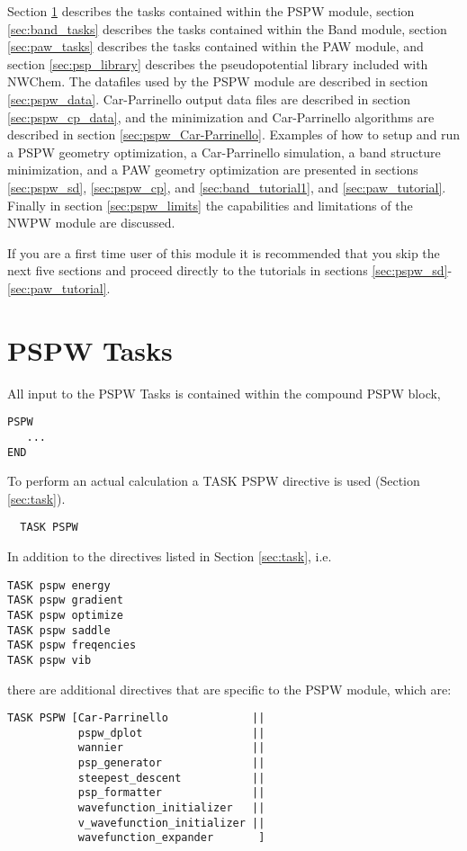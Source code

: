 Section \ref{sec:pspw_tasks} describes the tasks contained within the
PSPW module, section \ref{sec:band_tasks} describes the tasks
contained within the Band module, section \ref{sec:paw_tasks} describes
the tasks contained within the PAW module, and section \ref{sec:psp_library}
describes the pseudopotential library included with NWChem.  The
datafiles used by the PSPW module are described in section
\ref{sec:pspw_data}.  Car-Parrinello output data files are described
in section \ref{sec:pspw_cp_data}, and the minimization and
Car-Parrinello algorithms are described in 
section \ref{sec:pspw_Car-Parrinello}. 
Examples of how
to setup and run a PSPW geometry optimization, a Car-Parrinello
simulation, a band structure minimization, and a PAW geometry
optimization are presented in sections \ref{sec:pspw_sd}, \ref{sec:pspw_cp}, and
\ref{sec:band_tutorial1}, and \ref{sec:paw_tutorial}.  
Finally in section \ref{sec:pspw_limits} the capabilities and limitations of the NWPW module are  discussed.

If you are a first time user of this module it is recommended that you skip the next five sections and proceed directly to the tutorials in sections 
\ref{sec:pspw_sd}-\ref{sec:paw_tutorial}.

\section{PSPW Tasks}
\label{sec:pspw_tasks}

All input to the PSPW Tasks is contained within the compound PSPW block,
\begin{verbatim}
PSPW
   ...
END
\end{verbatim}

To perform an actual calculation a TASK PSPW directive is used
(Section \ref{sec:task}).  
\begin{verbatim}
  TASK PSPW
\end{verbatim} 
In addition to the directives listed in Section \ref{sec:task}, i.e.
\begin{verbatim}
TASK pspw energy          
TASK pspw gradient         
TASK pspw optimize         
TASK pspw saddle           
TASK pspw freqencies       
TASK pspw vib
\end{verbatim}
there are additional directives that are specific to the PSPW module, which are:
\begin{verbatim}
TASK PSPW [Car-Parrinello             ||
           pspw_dplot                 ||
           wannier                    ||
           psp_generator              ||
           steepest_descent           ||
           psp_formatter              ||
           wavefunction_initializer   ||
           v_wavefunction_initializer ||
           wavefunction_expander       ]
\end{verbatim}


